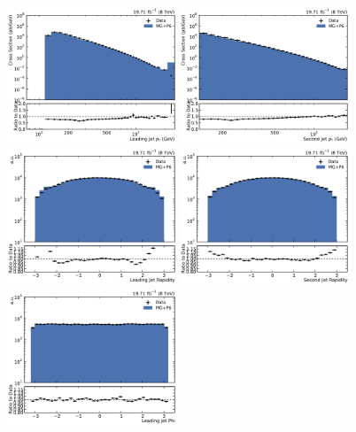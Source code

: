 \begin{figure}[htbp]
    \centering
    \includegraphics[width=0.45\textwidth]{figures/measurement/jet1pt_default.pdf}\hfill
    \includegraphics[width=0.45\textwidth]{figures/measurement/jet2pt_default.pdf}
    \includegraphics[width=0.45\textwidth]{figures/measurement/jet1rap_default.pdf}\hfill
    \includegraphics[width=0.45\textwidth]{figures/measurement/jet2rap_default.pdf}
    \includegraphics[width=0.45\textwidth]{figures/measurement/jet1phi_default.pdf}\hfill

\end{figure}
